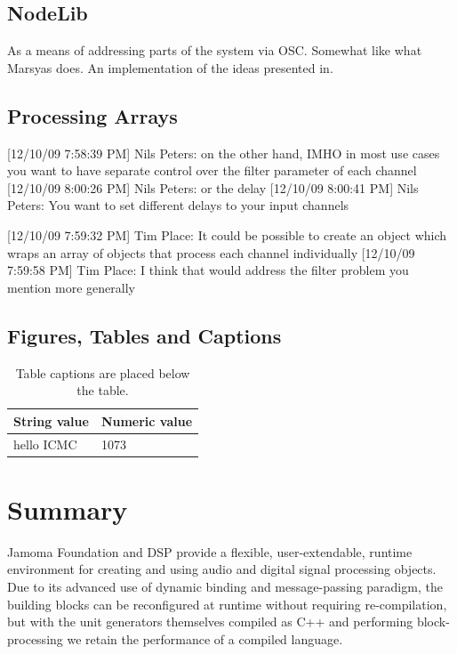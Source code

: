\documentclass[twoside,10pt]{article}
\begin{document}
\subsection{NodeLib}

As a means of addressing parts of the system via OSC.  Somewhat like what Marsyas does.  An implementation of the ideas presented in\cite{Place:2008osc}.

\subsection{Processing Arrays}
[12/10/09 7:58:39 PM] Nils Peters: on the other hand, IMHO in most use cases you want to have separate control over the filter parameter of each channel
[12/10/09 8:00:26 PM] Nils Peters: or the delay
[12/10/09 8:00:41 PM] Nils Peters: You want to set different delays to your input channels

[12/10/09 7:59:32 PM] Tim Place: It could be possible to create an object which wraps an array of objects that process each channel individually
[12/10/09 7:59:58 PM] Tim Place: I think that would address the filter problem you mention more generally


\subsection{Figures, Tables and Captions}

\begin{table}[htbp]
\begin{center}
\begin{tabular}{|l|l|}
\hline
String value & Numeric value \\
\hline
hello ICMC  & 1073 \\
\hline
\end{tabular}
\end{center}
\caption{Table captions are placed below the table.}
\label{tab:example}
\end{table}




\section{Summary} %

Jamoma Foundation and DSP provide a flexible, user-extendable, runtime environment for creating and using audio and digital signal processing objects.  Due to its advanced use of dynamic binding and message-passing paradigm, the building blocks can be reconfigured at runtime without requiring re-compilation, but with the unit generators themselves compiled as C++ and performing block-processing we retain the performance of a compiled language.
\end{document}
